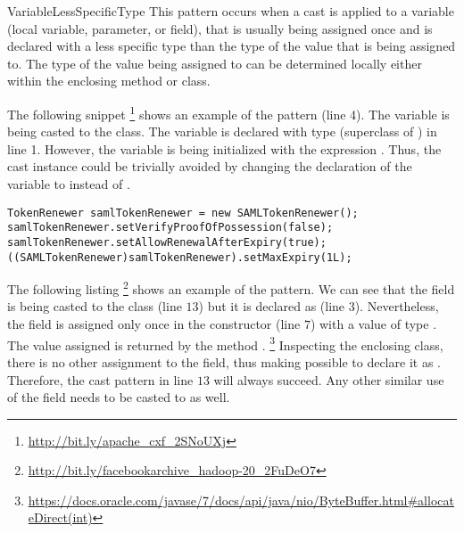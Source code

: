 \begin{pattern}{VariableLessSpecificType}
This pattern occurs when a cast is applied to a variable (local variable,
parameter, or field),
that is usually being assigned once and
is declared with a less specific type than the type of the value 
that is being assigned to.
The type of the value being assigned to can be determined locally
either within the enclosing method or class.

\instances{}
%
The following snippet%
\footnote{\url{http://bit.ly/apache_cxf_2SNoUXj}}
shows an example of the \thisp{} pattern (line 4).
The  variable is being casted to the  class.
The variable is declared with type  (superclass of ) in line 1.
However, the variable is being initialized with the expression . 
Thus, the cast instance could be trivially avoided by changing the declaration of the  variable to  instead of .

\begin{verbatim}
TokenRenewer samlTokenRenewer = new SAMLTokenRenewer();
samlTokenRenewer.setVerifyProofOfPossession(false);
samlTokenRenewer.setAllowRenewalAfterExpiry(true);
((SAMLTokenRenewer)samlTokenRenewer).setMaxExpiry(1L);
\end{verbatim}

The following listing%
\footnote{\url{http://bit.ly/facebookarchive_hadoop-20_2FuDeO7}}
shows an example of the \thisp{} pattern.
We can see that the field  is being casted to the  class (line $13$) but it is declared as  (line $3$).
Nevertheless, the field is assigned only once in the constructor (line $7$)
with a value of type .
The value assigned is returned by the method
.%
\footnote{\url{https://docs.oracle.com/javase/7/docs/api/java/nio/ByteBuffer.html\#allocateDirect(int)}}
Inspecting the enclosing class, there is no other assignment to the
 field,
thus making possible to declare it as .
Therefore, the cast pattern in line $13$ will always succeed.
Any other similar use of the  field needs to be casted to as well.


\end{pattern}
